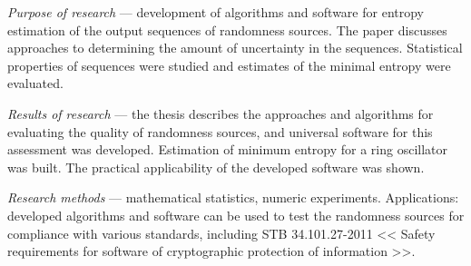 \documentclass[a4paper,12pt]{report}
\begin{document}
  \textit{Purpose of research} --- development of algorithms and software for entropy estimation of the output sequences of randomness sources. The paper discusses approaches to determining the amount of uncertainty in the sequences. Statistical properties of sequences were studied and estimates of the minimal entropy were evaluated.

  \textit{Results of research} --- the thesis describes the approaches and algorithms for evaluating the quality of randomness sources, and universal software for this assessment was developed. Estimation of minimum entropy for a ring oscillator was built. The practical applicability of the developed software was shown.

  \textit{Research methods} --- mathematical statistics, numeric experiments. Applications: developed algorithms and software can be used to test the randomness sources for compliance with various standards, including STB 34.101.27-2011 << Safety requirements for software of cryptographic protection of information >>.
\end{document}
